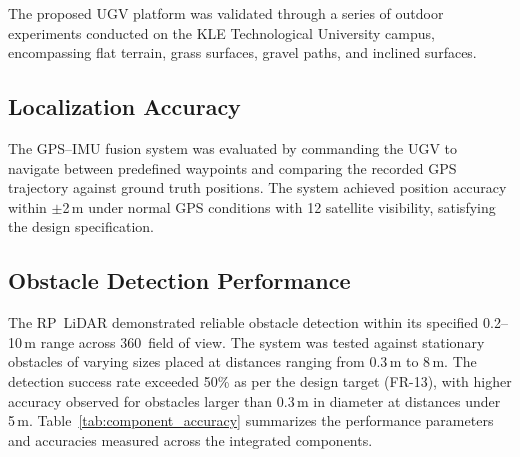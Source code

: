 \documentclass[conference]{IEEEtran}
\begin{document}
The proposed UGV platform was validated through a series of outdoor experiments conducted on the KLE Technological University campus, encompassing flat terrain, grass surfaces, gravel paths, and inclined surfaces.

\subsection{Localization Accuracy}

The GPS--IMU fusion system was evaluated by commanding the UGV to navigate between predefined waypoints and comparing the recorded GPS trajectory against ground truth positions. The system achieved position accuracy within $\pm$2\,m under normal GPS conditions with 12 satellite visibility, satisfying the design specification.

\subsection{Obstacle Detection Performance}

The RP~LiDAR demonstrated reliable obstacle detection within its specified 0.2--10\,m range across 360\textdegree\ field of view. The system was tested against stationary obstacles of varying sizes placed at distances ranging from 0.3\,m to 8\,m. The detection success rate exceeded 50\% as per the design target (FR-13), with higher accuracy observed for obstacles larger than 0.3\,m in diameter at distances under 5\,m. Table~\ref{tab:component_accuracy} summarizes the performance parameters and accuracies measured across the integrated components.

\begin{table}[htbp]
\caption{Component Performance and Measurement Accuracy}
\label{tab:component_accuracy}
\centering
{}
\end{table}
\end{document}
